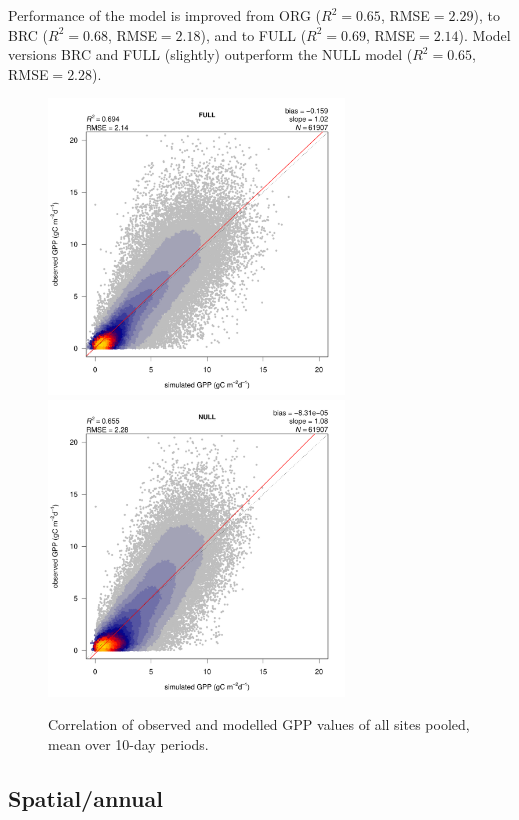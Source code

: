 \documentclass{myreport}
\begin{document}
Performance of the model is improved from ORG ($R^2=0.65$, RMSE$=2.29$), to BRC ($R^2=0.68$, RMSE$=2.18$), and to FULL ($R^2=0.69$, RMSE$=2.14$). Model versions BRC and FULL (slightly) outperform the NULL model ($R^2=0.65$, RMSE$=2.28$).

\begin{figure}[!ht]
    \centering
    \includegraphics[width=0.7\textwidth]{fig/modobs_xdaily_FULL.pdf}
    \includegraphics[width=0.7\textwidth]{fig/modobs_xdaily_NULL.pdf}
    \caption{Correlation of observed and modelled GPP values of all sites pooled, mean over 10-day periods.}
    \label{fig:modobs_xdaily}
\end{figure}

\clearpage

\subsection{Spatial/annual}
\end{document}
